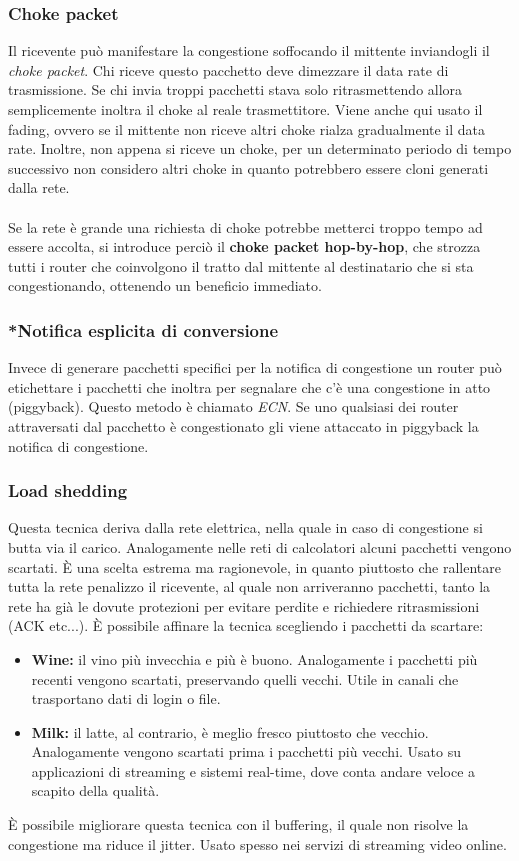 \documentclass[10pt,a4paper,twoside]{article}
\begin{document}
\subsubsection{Choke packet}
Il ricevente può manifestare la congestione soffocando il mittente inviandogli il \textit{choke packet}. Chi riceve questo pacchetto deve dimezzare il data rate di trasmissione. Se chi invia troppi pacchetti stava solo ritrasmettendo allora semplicemente inoltra il choke al reale trasmettitore. Viene anche qui usato il fading, ovvero se il mittente non riceve altri choke rialza gradualmente il data rate. Inoltre, non appena si riceve un choke, per un determinato periodo di tempo successivo non considero altri choke in quanto potrebbero essere cloni generati dalla rete.\\\\
Se la rete è grande una richiesta di choke potrebbe metterci troppo tempo ad essere accolta, si introduce perciò il \textbf{choke packet hop-by-hop}, che strozza tutti i router che coinvolgono il tratto dal mittente al destinatario che si sta congestionando, ottenendo un beneficio immediato.

\subsubsection{*Notifica esplicita di conversione}
Invece di generare pacchetti specifici per la notifica di congestione un router può etichettare i pacchetti che inoltra per segnalare che c'è una congestione in atto (piggyback). Questo metodo è chiamato \textit{ECN}. Se uno qualsiasi dei router attraversati dal pacchetto è congestionato gli viene attaccato in piggyback la notifica di congestione.

\subsubsection{Load shedding}
Questa tecnica deriva dalla rete elettrica, nella quale in caso di congestione si butta via il carico. Analogamente nelle reti di calcolatori alcuni pacchetti vengono scartati. È una scelta estrema ma ragionevole, in quanto piuttosto che rallentare tutta la rete penalizzo il ricevente, al quale non arriveranno pacchetti, tanto la rete ha già le dovute protezioni per evitare perdite e richiedere ritrasmissioni (ACK etc...). È possibile affinare la tecnica scegliendo i pacchetti da scartare:
\begin{itemize}
\item \textbf{Wine:} il vino più invecchia e più è buono. Analogamente i pacchetti più recenti vengono scartati, preservando quelli vecchi. Utile in canali che trasportano dati di login o file.
\item \textbf{Milk:} il latte, al contrario, è meglio fresco piuttosto che vecchio. Analogamente vengono scartati prima i pacchetti più vecchi. Usato su applicazioni di streaming e sistemi real-time, dove conta andare veloce a scapito della qualità.
\end{itemize}
È possibile migliorare questa tecnica con il buffering, il quale non risolve la congestione ma riduce il jitter. Usato spesso nei servizi di streaming video online.
\end{document}
